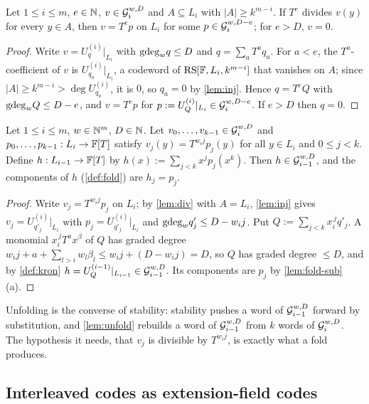 \begin{lemma}[Divisibility]\label{lem:div}
Let $1\le i\le m$, $e\in\mathbb{N}$, $v\in\mathcal{G}_i^{w,D}$ and $A\subseteq L_i$ with $|A|\ge k^{m-i}$. If
$T^e$ divides $v(y)$ for every $y\in A$, then $v=T^ep$ on $L_i$ for some $p\in\mathcal{G}_i^{w,D-e}$;
for $e>D$, $v=0$.
\end{lemma}

\begin{proof}
Write $v=U^{(i)}_q|_{L_i}$ with $\mathrm{gdeg}_w q\le D$ and $q=\sum_aT^aq_a$. For $a<e$, the
$T^a$-coefficient of $v$ is $U^{(i)}_{q_a}|_{L_i}$, a codeword of $\mathrm{RS}[\mathbb{F},L_i,k^{m-i}]$ that
vanishes on $A$; since $|A|\ge k^{m-i}>\deg U^{(i)}_{q_a}$, it is $0$, so $q_a=0$ by
\cref{lem:inj}. Hence $q=T^eQ$ with $\mathrm{gdeg}_w Q\le D-e$, and $v=T^ep$ for
$p:=U^{(i)}_Q|_{L_i}\in\mathcal{G}_i^{w,D-e}$. If $e>D$ then $q=0$.
\end{proof}

\begin{lemma}[Unfolding]\label{lem:unfold}
Let $1\le i\le m$, $w\in\mathbb{N}^m$, $D\in\mathbb{N}$. Let $v_0,\dots,v_{k-1}\in\mathcal{G}_i^{w,D}$ and
$p_0,\dots,p_{k-1}:L_i\to\mathbb{F}[T]$ satisfy $v_j(y)=T^{w_ij}p_j(y)$ for all $y\in L_i$ and
$0\le j<k$. Define $h:L_{i-1}\to\mathbb{F}[T]$ by $h(x):=\sum_{j<k}x^jp_j(x^k)$. Then
$h\in\mathcal{G}_{i-1}^{w,D}$, and the components of $h$ (\cref{def:fold}) are $h_j=p_j$.
\end{lemma}

\begin{proof}
Write $v_j=T^{w_ij}p_j$ on $L_i$; by \cref{lem:div} with $A=L_i$, \cref{lem:inj} gives
$v_j=U^{(i)}_{q'_j}|_{L_i}$ with $p_j=U^{(i)}_{q'_j}|_{L_i}$ and $\mathrm{gdeg}_w q'_j\le D-w_ij$. Put
$Q:=\sum_{j<k}x_i^{\,j}q'_j$. A monomial $x_i^{\,j}T^ax^\beta$ of $Q$ has graded degree
$w_ij+a+\sum_{l>i}w_l\beta_l\le w_ij+(D-w_ij)=D$, so $Q$ has graded degree $\le D$, and by
\cref{def:kron} $h=U^{(i-1)}_Q|_{L_{i-1}}\in\mathcal{G}_{i-1}^{w,D}$. Its components are $p_j$ by
\cref{lem:fold-sub}(a).
\end{proof}

Unfolding is the converse of stability: stability pushes a word of $\mathcal{G}_{i-1}^{w,D}$ forward by
substitution, and \cref{lem:unfold} rebuilds a word of $\mathcal{G}_{i-1}^{w,D}$ from $k$ words of
$\mathcal{G}_i^{w,D}$. The hypothesis it needs, that $v_j$ is divisible by $T^{w_ij}$, is exactly what a
fold produces.

\subsection{Interleaved codes as extension-field codes}\label{sec:interleaved}

